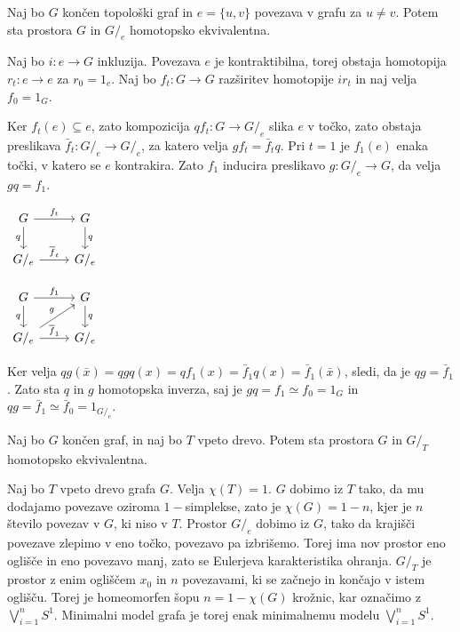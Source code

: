 \documentclass[mat1]{fmfdelo}
\begin{document}
\begin{trditev}
    Naj bo $G$ končen topološki graf in  $e=\{u,v\}$ povezava v grafu za $u\neq v$. Potem sta prostora $G$ in $G/_e$ homotopsko ekvivalentna.
\end{trditev}

\begin{dokaz}
    Naj bo $i\colon e\rightarrow G$ inkluzija. Povezava $e$ je kontraktibilna, torej obstaja homotopija $r_t\colon e \rightarrow e$ za $r_0=1_e$. Naj bo $f_t\colon G\rightarrow G$ razširitev homotopije $ir_t$ in naj velja $f_0=1_G$.

    Ker $f_t(e)\subseteq e$, zato kompozicija $qf_t\colon G\rightarrow G/_e$ slika $e$ v točko, zato obstaja preslikava $\bar{f}_t\colon G/_e\rightarrow G/_e$, za katero velja $gf_t=\bar{f}_tq$. Pri $t=1$ je $f_1(e)$ enaka točki, v katero se $e$ kontrakira. Zato $f_1$ inducira preslikavo $g\colon G/_e \rightarrow G$, da velja $gq=f_1$.
    \begin{minipage}{0.4\textwidth}
        \centering
        $\begin{tikzcd}
            {G}\arrow{r}{f_t} \arrow[swap]{d}{q} & {G} \arrow{d}{q} \\
            G/_e \arrow{r}{\overline{f}_t} & G/_e
        \end{tikzcd}
        $
    \end{minipage}
    \begin{minipage}{0.4\textwidth}
        \centering
        $\begin{tikzcd}
            {G}\arrow{r}{f_1} \arrow[swap]{d}{q} & {G} \arrow{d}{q} \\
            G/_e \arrow{ru}{g} \arrow{r}{\overline{f}_1} & G/_e
        \end{tikzcd}
        $
    \end{minipage}
    
    Ker velja $qg(\bar{x})=qgq(x)=qf_1(x)=\bar{f}_1 q(x)=\bar{f}_1(\bar{x})$, sledi, da je $qg=\bar{f}_1$. Zato sta $q$ in $g$ homotopska inverza, saj je $gq=f_1\simeq f_0=1_G$ in $qg=\bar{f}_1\simeq \bar{f}_0 = 1_{G/_e}$.
\end{dokaz}

\begin{posledica}
    Naj bo $G$ končen graf, in naj bo $T$ vpeto drevo. Potem sta 
    prostora $G$ in $G/_T$ homotopsko ekvivalentna.
\end{posledica}

Naj bo $T$ vpeto drevo grafa $G$. Velja $\chi(T)=1$. $G$ dobimo iz $T$ tako, da mu dodajamo povezave 
oziroma $1-$simplekse, zato je $\chi(G)=1-n$, kjer je $n$ število povezav v $G$, ki niso v 
$T$. Prostor $G/_e$ dobimo iz $G$, tako da krajišči povezave zlepimo v eno točko, povezavo pa 
izbrišemo. Torej ima nov prostor eno oglišče in eno povezavo manj, zato se Eulerjeva karakteristika 
ohranja. $G/_T$ je prostor z enim ogliščem $x_0$ in $n$ povezavami, ki se začnejo in končajo v istem 
oglišču. Torej je homeomorfen šopu $n=1-\chi(G)$ krožnic, kar označimo z $\bigvee\limits_{i=1}^{n}S^1$.
Minimalni model grafa je torej enak minimalnemu modelu  $\bigvee\limits_{i=1}^{n}S^1$.
\end{document}
